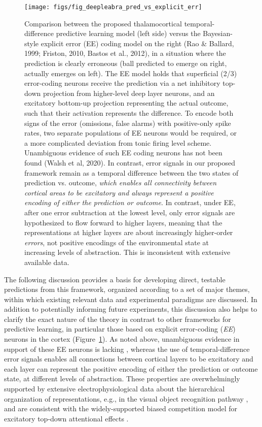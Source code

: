 \documentclass[11pt,twoside]{article}
\newif\myifpdf
\begin{document}
\begin{figure}
  \centering\texttt{[image: figs/fig\_deepleabra\_pred\_vs\_explicit\_err]}
  \caption{Comparison between the proposed thalamocortical temporal-difference predictive learning model (left side) versus the Bayesian-style explicit error (EE) coding model on the right (Rao \& Ballard, 1999; Friston, 2010, Bastos et al., 2012), in a situation where the prediction is clearly erroneous (ball predicted to emerge on right, actually emerges on left).  The EE model holds that superficial (2/3) error-coding neurons receive the prediction via a net inhibitory top-down projection from higher-level deep layer neurons, and an excitatory bottom-up projection representing the actual outcome, such that their activation represents the difference.  To encode both signs of the error (omissions, false alarms) with positive-only spike rates, two separate populations of EE neurons would be required, or a more complicated deviation from tonic firing level scheme.  Unambiguous evidence of such EE coding neurons has not been found (Walsh et al, 2020).  In contrast, error signals in our proposed framework remain as a temporal difference between the two states of prediction vs. outcome, \emph{which enables all connectivity between cortical areas to be excitatory and always represent a positive encoding of either the prediction or outcome}.  In contrast, under EE, after one error subtraction at the lowest level, only error signals are hypothesized to flow forward to higher layers, meaning that the representations at higher layers are about increasingly higher-order \emph{errors}, not positive encodings of the environmental state at increasing levels of abstraction.  This is inconsistent with extensive available data.}
  \label{fig.ee}
\end{figure}

The following discussion provides a basis for developing direct, testable predictions from this framework, organized according to a set of major themes, within which existing relevant data and experimental paradigms are discussed.  In addition to potentially informing future experiments, this discussion also helps to clarify the exact nature of the theory in contrast to other frameworks for predictive learning, in particular those based on  explicit error-coding (\emph{EE}) neurons in the cortex \cite{RaoBallard99,Friston10,BastosUsreyAdamsEtAl12,LotterKreimanCox16} (Figure~\ref{fig.ee}).  As noted above, unambiguous evidence in support of these EE neurons is lacking \cite{WalshMcGovernClarkEtAl20}, whereas the use of temporal-difference error signals enables all connections between cortical layers to be excitatory and each layer can represent the positive encoding of either the prediction or outcome state, at different levels of abstraction.  These properties are overwhelmingly supported by extensive electrophysiological data about the hierarchical organization of representations, e.g., in the visual object recognition pathway \cite{KobatakeTanaka94,VanRullenThorpe02,CadieuHongYaminsEtAl14}, and are consistent with the widely-supported biased competition model for excitatory top-down attentional effects \cite{DesimoneDuncan95,ReynoldsChelazziDesimone99,MillerCohen01,OReillyWyatteHerdEtAl13}.
\end{document}
